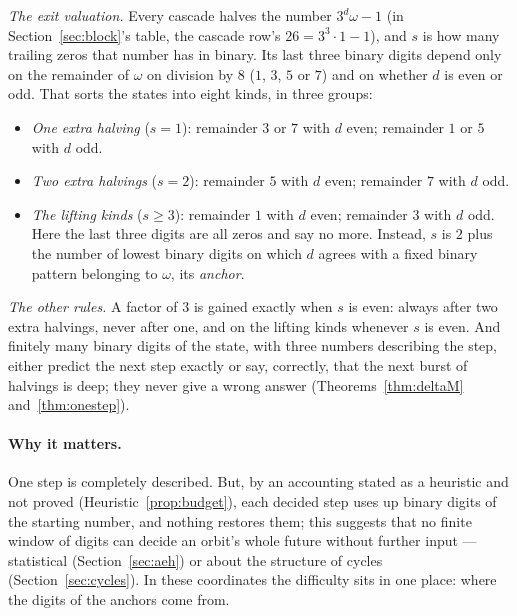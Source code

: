 \documentclass[11pt]{article}
\theoremstyle{remark}
\newcommand{\w}{\omega}
\begin{document}
\emph{The exit valuation.} Every cascade halves the number $3^d\w - 1$ (in Section~\ref{sec:block}'s table, the cascade row's $26 = 3^3 \cdot 1 - 1$), and $s$ is how many trailing zeros that number has in binary. Its last three binary digits depend only on the remainder of $\w$ on division by $8$ ($1$, $3$, $5$ or $7$) and on whether $d$ is even or odd. That sorts the states into eight kinds, in three groups:
\begin{itemize}
\item \emph{One extra halving} ($s = 1$): remainder $3$ or $7$ with $d$ even; remainder $1$ or $5$ with $d$ odd.
\item \emph{Two extra halvings} ($s = 2$): remainder $5$ with $d$ even; remainder $7$ with $d$ odd.
\item \emph{The lifting kinds} ($s \ge 3$): remainder $1$ with $d$ even; remainder $3$ with $d$ odd. Here the last three digits are all zeros and say no more. Instead, $s$ is $2$ plus the number of lowest binary digits on which $d$ agrees with a fixed binary pattern belonging to $\w$, its \emph{anchor}.
\end{itemize}

\emph{The other rules.} A factor of $3$ is gained exactly when $s$ is even: always after two extra halvings, never after one, and on the lifting kinds whenever $s$ is even. And finitely many binary digits of the state, with three numbers describing the step, either predict the next step exactly or say, correctly, that the next burst of halvings is deep; they never give a wrong answer (Theorems~\ref{thm:deltaM} and~\ref{thm:onestep}).

\paragraph{Why it matters.} One step is completely described. But, by an accounting stated as a heuristic and not proved (Heuristic~\ref{prop:budget}), each decided step uses up binary digits of the starting number, and nothing restores them; this suggests that no finite window of digits can decide an orbit's whole future without further input --- statistical (Section~\ref{sec:aeh}) or about the structure of cycles (Section~\ref{sec:cycles}). In these coordinates the difficulty sits in one place: where the digits of the anchors come from.
\end{document}

